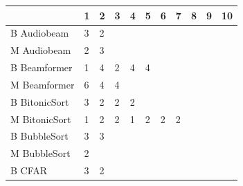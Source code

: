 \begin{table}[t]
\begin{minipage}{0.5\textwidth}
  \small
  \hspace{-5em}
 \begin{tabular} { | l | l | l | l | l | l | l | l | l | l |l| }
    \hline
      & \textbf{1} & \textbf{2} & \textbf{3} & \textbf{4} & \textbf{5} & \textbf{6} & \textbf{7} & \textbf{8} & \textbf{9} & \textbf{10} \\ \hline
    B Audiobeam & 3 & 2 & \cellcolor[gray]{0.3}& \cellcolor[gray]{0.3}& \cellcolor[gray]{0.3}& \cellcolor[gray]{0.3}& \cellcolor[gray]{0.3}& \cellcolor[gray]{0.3}& \cellcolor[gray]{0.3}& \cellcolor[gray]{0.3} \\ \hline 
    M Audiobeam & 2 & 3 & \cellcolor[gray]{0.3}& \cellcolor[gray]{0.3}& \cellcolor[gray]{0.3} & \cellcolor[gray]{0.3}& \cellcolor[gray]{0.3}& \cellcolor[gray]{0.3}& \cellcolor[gray]{0.3}& \cellcolor[gray]{0.3}\\ \hline\hline
    B Beamformer & 1 & 4 & 2 & 4 & 4& \cellcolor[gray]{0.3}& \cellcolor[gray]{0.3}& \cellcolor[gray]{0.3}& \cellcolor[gray]{0.3}& \cellcolor[gray]{0.3} \\ \hline 
    M Beamformer & 6 & 4 & 4& \cellcolor[gray]{0.3}& \cellcolor[gray]{0.3}& \cellcolor[gray]{0.3}& \cellcolor[gray]{0.3}& \cellcolor[gray]{0.3}& \cellcolor[gray]{0.3}& \cellcolor[gray]{0.3} \\ \hline\hline
    B BitonicSort & 3 & 2 & 2 & 2 & \cellcolor[gray]{0.3}& \cellcolor[gray]{0.3}& \cellcolor[gray]{0.3}& \cellcolor[gray]{0.3}& \cellcolor[gray]{0.3}& \cellcolor[gray]{0.3}  \\ \hline
    M BitonicSort & 1 & 2 & 2 & 1 & 2 & 2 & 2 & \cellcolor[gray]{0.3}& \cellcolor[gray]{0.3}& \cellcolor[gray]{0.3} \\ \hline\hline
    B BubbleSort & 3 & 3& \cellcolor[gray]{0.3} & \cellcolor[gray]{0.3} & \cellcolor[gray]{0.3}& \cellcolor[gray]{0.3}& \cellcolor[gray]{0.3}& \cellcolor[gray]{0.3}& \cellcolor[gray]{0.3}& \cellcolor[gray]{0.3} \\ \hline
    M BubbleSort & 2 & \cellcolor[gray]{0.3} & \cellcolor[gray]{0.3} & \cellcolor[gray]{0.3} & \cellcolor[gray]{0.3}& \cellcolor[gray]{0.3}& \cellcolor[gray]{0.3}& \cellcolor[gray]{0.3}& \cellcolor[gray]{0.3}& \cellcolor[gray]{0.3} \\ \hline\hline
    B CFAR & 3 & 2 & \cellcolor[gray]{0.3} & \cellcolor[gray]{0.3} & \cellcolor[gray]{0.3}& \cellcolor[gray]{0.3}& \cellcolor[gray]{0.3}& \cellcolor[gray]{0.3}& \cellcolor[gray]{0.3}& \cellcolor[gray]{0.3} \\ \hline 

\end{tabular}
\end{minipage}
\end{table}
